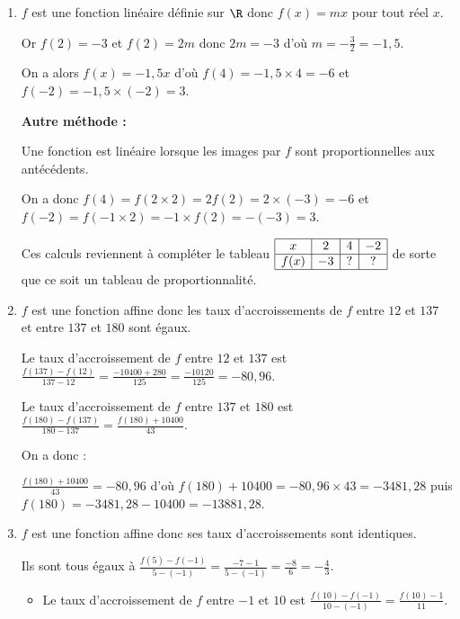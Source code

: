 %
%
%
%
\begin{exr}
  \begin{enumerate}
  \item $f$ est une fonction linéaire définie sur $\R$ donc $f(x)=mx$ pour tout réel $x$.
  
  Or $f(2)=-3$ et $f(2)=2m$ donc $2m=-3$ d'où $m=-\frac32=-1,5$.
  
  On a alors $f(x)=-1,5x$ d'où $f(4)=-1,5\times4=-6$ et $f(-2)=-1,5\times(-2)=3$.

\textbf{Autre méthode :}

Une fonction est linéaire lorsque les images par $f$ sont proportionnelles aux antécédents.

On a donc $f(4)=f(2\times2)=2f(2)=2\times(-3)=-6$ et $f(-2)=f(-1\times2)=-1\times f(2)=-(-3)=3$.

Ces calculs reviennent à compléter le tableau  
    $\begin{array}{|c|c|c|c|}\hline
    x     & 2 & 4 & -2 \\ \hline
    f(x) & -3 &   ?  & ?   \\ \hline
    \end{array}$ de sorte que ce soit un tableau de proportionnalité.
  \item $f$ est une fonction affine donc les taux d'accroissements de $f$ entre $12$ et $137$  et entre $137$ et $180$ sont égaux.
  
  Le taux d'accroissement de $f$ entre $12$ et $137$ est $\frac{f(137)-f(12)}{137-12}=\frac{-10400+280}{125}=\frac{-10120}{125}=-80,96$.

  Le taux d'accroissement de $f$ entre $137$ et $180$ est $\frac{f(180)-f(137)}{180-137}=\frac{f(180)+10400}{43}$.
  
  On a donc :
  \vspace*{0.5ex}
  \begin{centered} 
   $\frac{f(180)+10400}{43}=-80,96$ d'où $f(180)+10400=-80,96\times43=-3481,28$ puis $f(180)=-3481,28-10400=-13881,28$.
  \end{centered} 
  \item $f$ est une fonction affine donc ses taux d'accroissements sont identiques.
  
  Ils sont tous égaux à $\frac{f(5)-f(-1)}{5-(-1)}=\frac{-7-1}{5-(-1)}=\frac{-8}{6}=-\frac43$.
  
  \begin{itemize}
  \item Le taux d'accroissement de $f$ entre $-1$ et $10$ est $\frac{f(10)-f(-1)}{10-(-1)}=\frac{f(10)-1}{11}$. 


\end{itemize}
\end{enumerate}
\end{exr}
